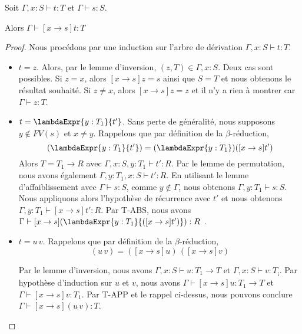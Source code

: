 \begin{lemma} 
  Soit $\Gamma, x : S \vdash t : T$ et $\Gamma \vdash s : S$.

  Alors $\Gamma \vdash [x \rightarrow s] t : T$
\end{lemma}

\begin{proof}
  Nous procédons par une induction sur l'arbre de dérivation $\Gamma, x : S \vdash t : T$.

  \begin{itemize}
  \item $t = z$. Alors, par le lemme d'inversion, $(z, T) \in \Gamma, x : S$.
    Deux cas sont possibles. Si $z = x$, alors $[x \rightarrow s] z = s$ ainsi que
    $S = T$ et nous obtenons le résultat souhaité. Si $z \neq x$,
    alors $[x \rightarrow s] z = z$ et il n'y a rien à montrer car $\Gamma
    \vdash z : T$.
  \item $t = \lambdaExpr{y : T_{1}}{t'}$.
    Sans perte de généralité, nous supposons
      $y \notin FV(s)$ et $x \neq y$. 
    Rappelons que par définition de la $\beta$-réduction,
    \begin{equation*}
      [x \rightarrow s](\lambdaExpr{y : T_{1}}{t'}) = (\lambdaExpr{y : T_{1}})([x \rightarrow s] t')
    \end{equation*}
Alors $T = T_{1} \rightarrow R$ avec
      $\Gamma, x : S, y : T_{1} \vdash t' : R$. Par le lemme de permutation,
      nous avons également $\Gamma, y : T_{1}, x : S \vdash t' : R$. En utilisant le lemme
      d'affaiblissement avec $\Gamma \vdash s : S$, comme $y \notin \Gamma$,
      nous obtenons $\Gamma, y : T_{1} \vdash s : S$.
      Nous appliquons alors l'hypothèse de récurrence avec $t'$ et nous obtenons
      $\Gamma, y : T_{1} \vdash [x \rightarrow s] t' : R$. Par T-ABS, nous avons
      $\Gamma \vdash [x \rightarrow s] (\lambdaExpr{y : T_{1}}{([x \rightarrow s]t')}) : R$ .

    \item $t = u \, v$.
      Rappelons que par définition de la $\beta$-réduction,
      \begin{equation*}
        [x \rightarrow s](u \, v) = ([x \rightarrow s] u) \, ([x \rightarrow s] v)
      \end{equation*}

      Par le lemme d'inversion, nous avons $\Gamma, x : S
      \vdash u : T_{1} \rightarrow T$ et $\Gamma, x : S \vdash v : T_{¡}$. Par
      hypothèse d'induction sur $u$ et $v$, nous avons $\Gamma \vdash [x \rightarrow s]u :
      T_{1} \rightarrow T$ et
      $\Gamma \vdash [x \rightarrow s]v : T_{1}$. Par T-APP et le rappel
      ci-dessus, nous pouvons conclure $\Gamma \vdash [x \rightarrow s](u \, v)
      : T$.
  \end{itemize}
  
\end{proof}

